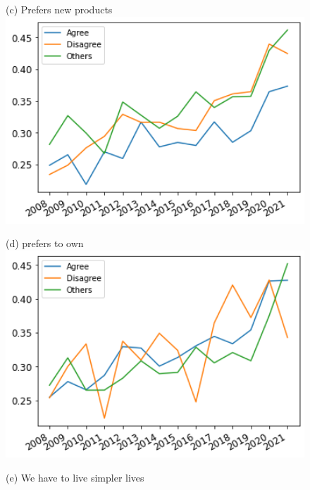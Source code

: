 \documentclass[12pt]{article}
\begin{document}
\begin{figure}[h!!]
	\begin{minipage}[h!!]{0.32\textwidth}
		\centering\footnotesize{(c) Prefers new products}
		\includegraphics[width=1\textwidth]{../codding_data/results/liss/broad_groups_notnecessaryqk20a148_ci306.png}
	\end{minipage}
	\begin{minipage}[h!!]{0.32\textwidth}
		\centering\footnotesize{(d) prefers to own}
		\includegraphics[width=1\textwidth]{../codding_data/results/liss/broad_groups_notnecessaryqk20a144_ci306.png}
	\end{minipage}
	\begin{minipage}[h!!]{0.32\textwidth}
		\centering\footnotesize{(e) We have to live simpler lives}

\end{minipage}
\end{figure}
\end{document}
